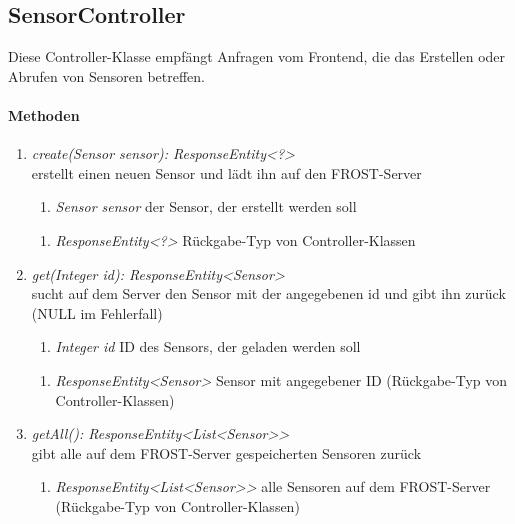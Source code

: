 \subsection*{SensorController}\label{sensCon}
Diese Controller-Klasse empfängt Anfragen vom Frontend, die das Erstellen oder Abrufen von Sensoren betreffen.

\paragraph{Methoden}

\begin{enumerate}[+]
	\item \textit{ create(Sensor sensor): ResponseEntity<?> }\\
	erstellt einen neuen Sensor und lädt ihn auf den FROST-Server
	
	\begin{enumerate}[$\bullet$]
		\item \textit{Sensor sensor} der Sensor, der erstellt werden soll
		
	\end{enumerate}
	\vspace{-0.2cm}
	\begin{enumerate}[$\circ$]
		\item \textit{ResponseEntity<?>} Rückgabe-Typ von Controller-Klassen
	\end{enumerate}
	
	\item \textit{ get(Integer id): ResponseEntity<Sensor> }\\
	sucht auf dem Server den Sensor mit der angegebenen id und gibt ihn zurück (NULL im Fehlerfall)
	
	\begin{enumerate}[$\bullet$]
		\item \textit{Integer id} ID des Sensors, der geladen werden soll
		
	\end{enumerate}
	\vspace{-0.2cm}
	\begin{enumerate}[$\circ$]
		\item \textit{ResponseEntity<Sensor>} Sensor mit angegebener ID (Rückgabe-Typ von Controller-Klassen)
	\end{enumerate}
	\item \textit{ getAll(): ResponseEntity<List<Sensor>> }\\
	gibt alle auf dem FROST-Server gespeicherten Sensoren zurück
	
	\begin{enumerate}[$\circ$]
		\item \textit{ResponseEntity<List<Sensor>>} alle Sensoren auf dem FROST-Server (Rückgabe-Typ von Controller-Klassen)
	\end{enumerate}
	
	
\end{enumerate}